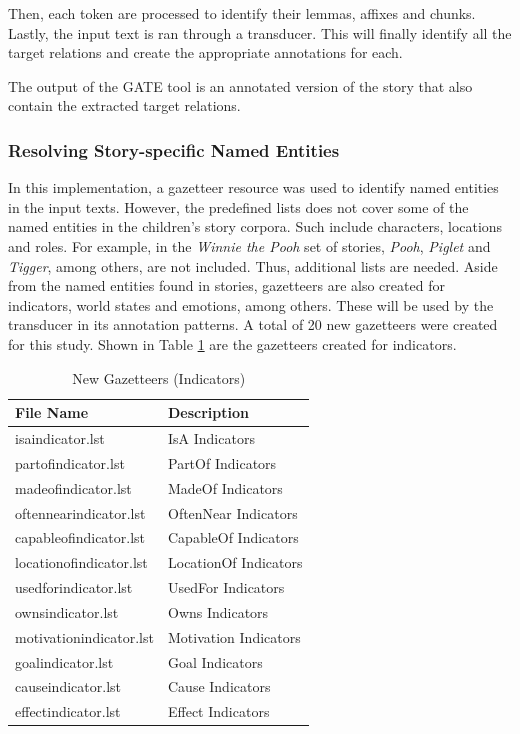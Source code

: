 Then, each token are processed to identify their lemmas, affixes and chunks. Lastly, the input text is ran through a transducer. This will finally identify all the target relations and create the appropriate annotations for each.

The output of the GATE tool is an annotated version of the story that also contain the extracted target relations.

\subsubsection{Resolving Story-specific Named Entities}
\label{sec:gazetteer}

In this implementation, a gazetteer resource was used to identify named entities in the input texts. However, the predefined lists does not cover some of the named entities in the children's story corpora. Such include characters, locations and roles. For example, in the \textit{Winnie the Pooh} set of stories, \textit{Pooh}, \textit{Piglet} and \textit{Tigger}, among others, are not included. Thus, additional lists are needed. Aside from the named entities found in stories, gazetteers are also created for indicators, world states and emotions, among others. These will be used by the transducer in its annotation patterns. A total of 20 new gazetteers were created for this study. Shown in Table \ref{tab:newgazetteersind} are the gazetteers created for indicators.

\begin{table}[H]   %
\centering
\caption{New Gazetteers (Indicators)} \vspace{0.25em}
\begin{tabular}{|p{5cm}|p{5cm}|} \hline
\textbf{File Name} & \textbf{Description} \\ \hline
isaindicator.lst			& IsA Indicators \\ \hline
partofindicator.lst			& PartOf Indicators \\ \hline
madeofindicator.lst			& MadeOf Indicators \\ \hline
oftennearindicator.lst		& OftenNear Indicators \\ \hline
capableofindicator.lst		& CapableOf Indicators \\ \hline
locationofindicator.lst		& LocationOf Indicators \\ \hline
usedforindicator.lst		& UsedFor Indicators \\ \hline
ownsindicator.lst 			& Owns Indicators \\ \hline
motivationindicator.lst		& Motivation Indicators \\ \hline
goalindicator.lst			& Goal Indicators \\ \hline
causeindicator.lst			& Cause Indicators \\ \hline
effectindicator.lst			& Effect Indicators \\ \hline
\end{tabular}
\label{tab:newgazetteersind}
\end{table}

